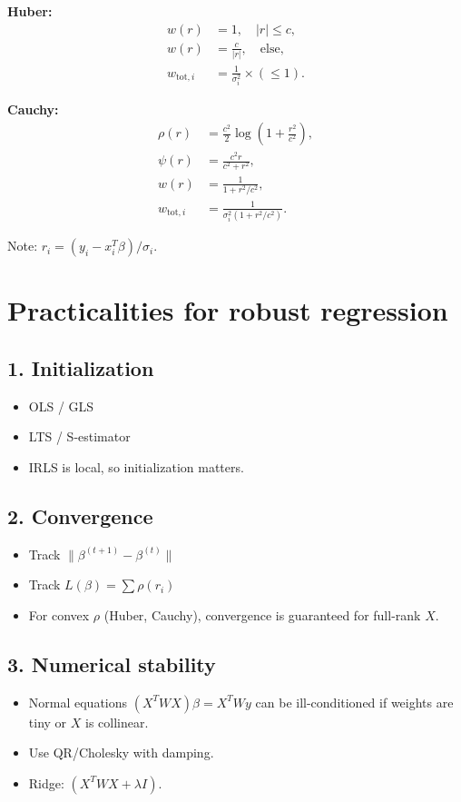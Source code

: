\documentclass{article}
\begin{document}
\textbf{Huber:}
\begin{align*}
w(r) &= 1, \quad |r|\le c, \\
w(r) &= \tfrac{c}{|r|}, \quad \text{else}, \\
w_{\text{tot}, i} &= \frac{1}{\sigma_i^2}\times (\le 1).
\end{align*}

\textbf{Cauchy:}
\begin{align*}
\rho(r) &= \tfrac{c^2}{2} \log\!\left(1+\frac{r^2}{c^2}\right), \\
\psi(r) &= \frac{c^2 r}{c^2 + r^2}, \\
w(r) &= \frac{1}{1+r^2/c^2}, \\
w_{\text{tot}, i} &= \frac{1}{\sigma_i^2 (1+r^2/c^2)}.
\end{align*}

Note: $r_i = (y_i - x_i^T \beta)/\sigma_i$.

\section*{Practicalities for robust regression}

\subsection*{1. Initialization}
\begin{itemize}
    \item OLS / GLS
    \item LTS / S-estimator
    \item IRLS is local, so initialization matters.
\end{itemize}

\subsection*{2. Convergence}
\begin{itemize}
    \item Track $\|\beta^{(t+1)} - \beta^{(t)}\|$
    \item Track $L(\beta) = \sum \rho(r_i)$
    \item For convex $\rho$ (Huber, Cauchy), convergence is guaranteed for full-rank $X$.
\end{itemize}

\subsection*{3. Numerical stability}
\begin{itemize}
    \item Normal equations $(X^T W X)\beta = X^T W y$ can be ill-conditioned if weights are tiny or $X$ is collinear.
    \item Use QR/Cholesky with damping.
    \item Ridge: $(X^T W X + \lambda I)$.
\end{itemize}
\end{document}
